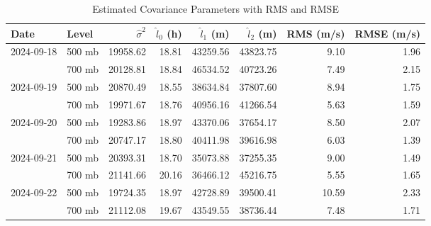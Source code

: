 \begin{table}[ht!]
\centering
\begin{tabular}{llrrrrrr}
\hline
{Date} & {Level} & $\hat{\sigma}^2$ & $\hat{l}_0$ (h) & $\hat{l}_1$ (m) & $\hat{l}_2$ (m) & RMS (m/s) & RMSE (m/s) \\
\hline
\multirow{2}{*}{2024-09-18} & 500 mb & 19958.62 & 18.81 & 43259.56 & 43823.75 & 9.10 & 1.96 \\
 & 700 mb & 20128.81 & 18.84 & 46534.52 & 40723.26 & 7.49 & 2.15 \\
\hline
\multirow{2}{*}{2024-09-19} & 500 mb & 20870.49 & 18.55 & 38634.84 & 37807.60 & 8.94 & 1.75 \\
 & 700 mb & 19971.67 & 18.76 & 40956.16 & 41266.54 & 5.63 & 1.59 \\
\hline
\multirow{2}{*}{2024-09-20} & 500 mb & 19283.86 & 18.97 & 43370.06 & 37654.17 & 8.50 & 2.07 \\
 & 700 mb & 20747.17 & 18.80 & 40411.98 & 39616.98 & 6.03 & 1.39 \\
\hline
\multirow{2}{*}{2024-09-21} & 500 mb & 20393.31 & 18.70 & 35073.88 & 37255.35 & 9.00 & 1.49 \\
 & 700 mb & 21141.66 & 20.16 & 36466.12 & 45216.75 & 5.55 & 1.65 \\
\hline
\multirow{2}{*}{2024-09-22} & 500 mb & 19724.35 & 18.97 & 42728.89 & 39500.41 & 10.59 & 2.33 \\
 & 700 mb & 21112.08 & 19.67 & 43549.55 & 38736.44 & 7.48 & 1.71 \\
\hline
\end{tabular}
\caption{Estimated Covariance Parameters with RMS and RMSE}
\label{tab:cov_est}
\end{table}
